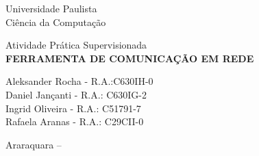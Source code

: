 \begin{center}
	\Huge Universidade Paulista\\
	\large Ciência da Computação
	
	\vfill
	
	\large Atividade Prática Supervisionada\\
	\textbf{\MakeUppercase{Ferramenta de comunicação em rede}}
	
	\bigskip
	\bigskip
	
	\normalsize{
		Aleksander Rocha - R.A.:C630IH-0\\
		Daniel Jançanti - R.A.: C630IG-2\\
		Ingrid Oliveira - R.A.: C51791-7\\
		Rafaela Aranas - R.A.: C29CII-0\\	
	}
	
	\vfill
	
	Araraquara -- \the\year

\end{center}

\thispagestyle{empty}